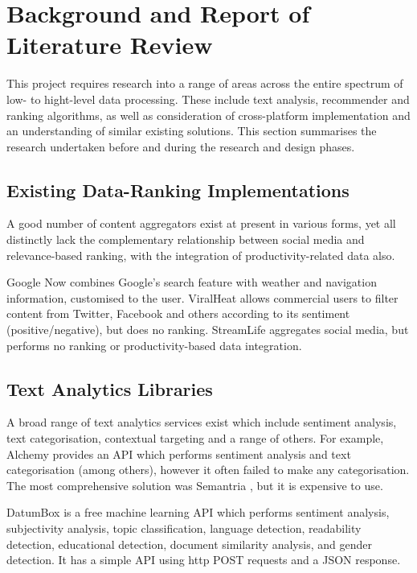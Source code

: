 \chapter{Background and Report of Literature Review}

This project requires research into a range of areas across the entire spectrum of low- to hight-level data processing. These include text analysis, recommender and ranking algorithms, as well as consideration of cross-platform implementation and an understanding of similar existing solutions. This section summarises the research undertaken before and during the research and design phases.

\section{Existing Data-Ranking Implementations}

A good number of content aggregators exist at present in various forms, yet all distinctly lack the complementary relationship between social media and relevance-based ranking, with the integration of productivity-related data also. 

Google Now \cite{GoogleNow} combines Google's search feature with weather and navigation information, customised to the user. ViralHeat \cite{ViralHeat} allows commercial users to filter content from Twitter, Facebook and others according to its sentiment (positive/negative), but does no ranking. StreamLife \cite{StreamLife} aggregates social media, but performs no ranking or productivity-based data integration. 

\section{Text Analytics Libraries}

A broad range of text analytics services exist which include sentiment analysis, text categorisation, contextual targeting and a range of others. For example, Alchemy provides an API which performs sentiment analysis and text categorisation (among others), however it often failed to make any categorisation. The most comprehensive solution was Semantria \cite{Semantria}, but it is expensive to use. 

DatumBox \cite{DatumBox} is a free machine learning API which performs sentiment analysis, subjectivity analysis, topic classification, language detection, readability detection, educational detection, document similarity analysis, and gender detection. It has a simple API using http POST requests and a JSON response. 

